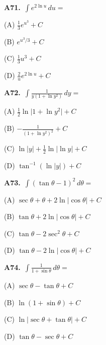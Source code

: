 \documentclass[11pt]{article}
\begin{document}
\bigskip\noindent\textbf{A71.}\ $\displaystyle\int e^{2\ln u}\,du=$
\begin{list}{}{\setlength{\leftmargin}{3em}\setlength{\labelwidth}{2.5em}\setlength{\itemsep}{0pt}\setlength{\topsep}{2pt}}
\item[(A)] $\frac13e^{u^3}+C$
\item[(B)] $e^{u^3/3}+C$
\item[(C)] $\frac13u^3+C$
\item[(D)] $\frac2u e^{2\ln u}+C$
\end{list}

\bigskip\noindent\textbf{A72.}\ $\displaystyle\int \frac1{y(1+\ln y^2)}\,dy=$
\begin{list}{}{\setlength{\leftmargin}{3em}\setlength{\labelwidth}{2.5em}\setlength{\itemsep}{0pt}\setlength{\topsep}{2pt}}
\item[(A)] $\frac12\ln\lvert1+\ln y^2\rvert+C$
\item[(B)] $-\frac1{(1+\ln y^2)^2}+C$
\item[(C)] $\ln\lvert y\rvert+\frac12\ln\lvert\ln y\rvert+C$
\item[(D)] $\tan^{-1}(\ln\lvert y\rvert)+C$
\end{list}

\bigskip\noindent\textbf{A73.}\ $\displaystyle\int (\tan\theta-1)^2\,d\theta=$
\begin{list}{}{\setlength{\leftmargin}{3em}\setlength{\labelwidth}{2.5em}\setlength{\itemsep}{0pt}\setlength{\topsep}{2pt}}
\item[(A)] $\sec\theta+\theta+2\ln\lvert\cos\theta\rvert+C$
\item[(B)] $\tan\theta+2\ln\lvert\cos\theta\rvert+C$
\item[(C)] $\tan\theta-2\sec^2\theta+C$
\item[(D)] $\tan\theta-2\ln\lvert\cos\theta\rvert+C$
\end{list}

\bigskip\noindent\textbf{A74.}\ $\displaystyle\int \frac1{1+\sin\theta}\,d\theta=$
\begin{list}{}{\setlength{\leftmargin}{3em}\setlength{\labelwidth}{2.5em}\setlength{\itemsep}{0pt}\setlength{\topsep}{2pt}}
\item[(A)] $\sec\theta-\tan\theta+C$
\item[(B)] $\ln(1+\sin\theta)+C$
\item[(C)] $\ln\lvert\sec\theta+\tan\theta\rvert+C$
\item[(D)] $\tan\theta-\sec\theta+C$
\end{list}
\end{document}
